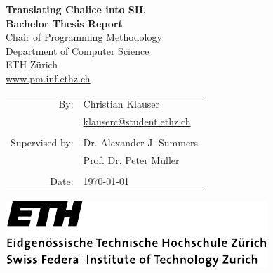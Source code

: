 
\begin{titlepage}
\begin{center}
{ \Huge \bfseries \sffamily Translating Chalice into SIL }\\[1.5cm]
{ \Huge \bfseries \sffamily Bachelor Thesis Report}\\[2cm]

Chair of Programming Methodology\\
Department of Computer Science\\
ETH Zürich\\
\href{http://www.pm.inf.ethz.ch}{www.pm.inf.ethz.ch}\\[3cm]

\begin{tabular}{rl}
By: & Christian Klauser \\
    & \href{mailto:klauserc@student.ethz.ch}{klauserc@student.ethz.ch} \\
    & \\
Supervised by: & Dr. Alexander J. Summers \\
               & Prof. Dr. Peter Müller \\
    & \\
Date: & \today \\
\end{tabular}

\vfill

\includegraphics{src/ETHlogo.pdf}


\end{center}

\end{titlepage}